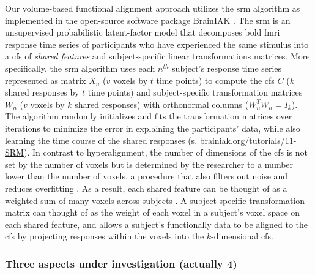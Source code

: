 Our volume-based functional alignment approach utilizes the \ac{srm} algorithm
\citep{chen2015reduced, richard2019fast} as implemented in the open-source
software package BrainIAK \citep[Brain Imaging Analysis Kit;
\href{https://brainiak.org}{\url{brainiak.org}};][]{kumar2020brainiak,
kumar2020brainiaktutorial}.
The \ac{srm} is an unsupervised probabilistic latent-factor model that
decomposes \ac{bold} \ac{fmri} response time series of participants who have
experienced the same stimulus into a \ac{cfs} of \textit{shared features}
\citep[also called ``\textit{shared feature space}'';][]{chen2015reduced} and
subject-specific linear transformations matrices.
More specifically, the \ac{srm} algorithm uses each $n^{th}$ subject's response
time series represented as matrix $X_{n}$ ({$v$} voxels by $t$ time points) to
compute the \ac{cfs} $C$ ($k$ shared responses by $t$ time points) and
subject-specific transformation matrices $W_{n}$ ($v$ voxels by $k$ shared
responses) with orthonormal columns ($W_{n}^{T}W_{n}=I_{k}$).
The algorithm randomly initializes and fits the transformation matrices over
iterations to minimize the error in explaining the participants' data, while
also learning the time course of the shared responses (s.
\href{https://brainiak.org/tutorials/11-SRM/}{\url{brainiak.org/tutorials/11-SRM}}).
In contrast to hyperalignment, the number of dimensions of the \ac{cfs} is not
set by the number of voxels but is determined by the researcher to a number
lower than the number of voxels, a procedure that also filters out noise and
reduces overfitting \citep{chen2015reduced}.
As a result, each shared feature can be thought of as a weighted sum of many
voxels across subjects \citep{kumar2020brainiak}.
A subject-specific transformation matrix can thought of as the weight of each
voxel in a subject's voxel space on each shared feature, and allows a subject's
functionally data to be aligned to the \ac{cfs} by projecting responses within
the voxels into the $k$-dimensional \ac{cfs}.



\subsubsection{Three aspects under investigation (actually 4)}


